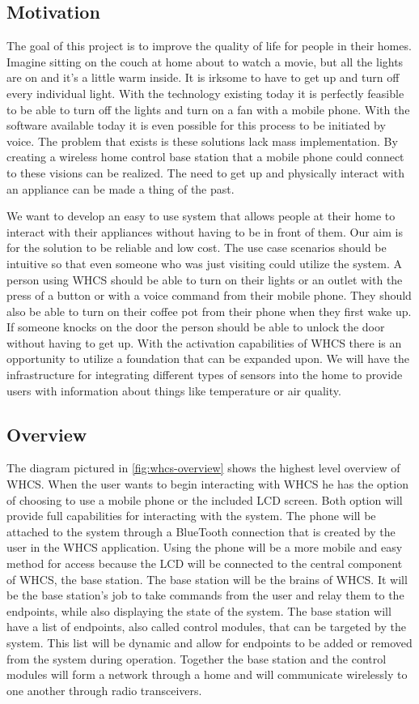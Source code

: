 \subsection{Motivation}
The goal of this project is to improve the quality of life for people in their
homes. Imagine sitting on the couch at home about to watch a movie, but all the
lights are on and it{}'s a little warm inside. It is irksome to have to get up
and turn off every individual light. With the technology existing today it is
perfectly feasible to be able to turn off the lights and turn on a fan with a
mobile phone. With the software available today it is even possible for this
process to be initiated by voice. The problem that exists is these solutions
lack mass implementation. By creating a wireless home control base station that
a mobile phone could connect to these visions can be realized. The need to get
up and physically interact with an appliance can be made a thing of the past.

We want to develop an easy to use system that allows people at their home to
interact with their appliances without having to be in front of them. Our aim
is for the solution to be reliable and low cost. The use case scenarios should
be intuitive so that even someone who was just visiting could utilize the
system. A person using WHCS should be able to turn on their lights or an outlet
with the press of a button or with a voice command from their mobile phone.
They should also be able to turn on their coffee pot from their phone when they
first wake up. If someone knocks on the door the person should be able to
unlock the door without having to get up. With the activation capabilities of
WHCS there is an opportunity to utilize a foundation that can be expanded upon.
We will have the infrastructure for integrating different types of sensors into
the home to provide users with information about things like temperature or air
quality.

\subsection{Overview}
The diagram pictured in \autoref{fig:whcs-overview} shows the highest level
overview of WHCS.  When the user wants to begin interacting with WHCS he has
the option of choosing to use a mobile phone or the included LCD screen. Both
option will provide full capabilities for interacting with the system. The
phone will be attached to the system through a BlueTooth connection that is
created by the user in the WHCS application. Using the phone will be a more
mobile and easy method for access because the LCD will be connected to the
central component of WHCS, the base station. The base station will be the
brains of WHCS. It will be the base station{}'s job to take commands from the
user and relay them to the endpoints, while also displaying the state of the
system. The base station will have a list of endpoints, also called control
modules, that can be targeted by the system. This list will be dynamic and
allow for endpoints to be added or removed from the system during operation.
Together the base station and the control modules will form a network through a
home and will communicate wirelessly to one another through radio transceivers.

